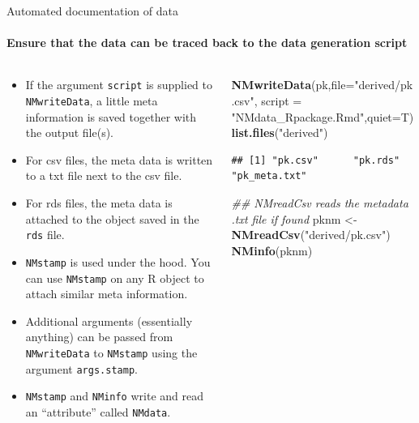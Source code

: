 \documentclass[
  8pt,
  ignorenonframetext,
  aspectratio=169]{beamer}
\newenvironment{Shaded}{\begin{snugshade}}{\end{snugshade}}
\newcommand{\CommentTok}[1]{\textcolor[rgb]{0.56,0.35,0.01}{\textit{#1}}}
\newcommand{\DataTypeTok}[1]{\textcolor[rgb]{0.13,0.29,0.53}{#1}}
\newcommand{\KeywordTok}[1]{\textcolor[rgb]{0.13,0.29,0.53}{\textbf{#1}}}
\newcommand{\NormalTok}[1]{#1}
\newcommand{\StringTok}[1]{\textcolor[rgb]{0.31,0.60,0.02}{#1}}
\begin{document}
\begin{frame}[fragile]{Automated documentation of data}
\protect\hypertarget{automated-documentation-of-data}{}
\framesubtitle{Ensure that the data can be traced back to the data generation script}

\begin{columns}[T]
\begin{column}{0.48\textwidth}
\begin{itemize}
\item
  If the argument \texttt{script} is supplied to \texttt{NMwriteData}, a
  little meta information is saved together with the output file(s).
\item
  For csv files, the meta data is written to a txt file next to the csv
  file.
\item
  For rds files, the meta data is attached to the object saved in the
  \texttt{rds} file.
\item
  \texttt{NMstamp} is used under the hood. You can use \texttt{NMstamp}
  on any R object to attach similar meta information.
\item
  Additional arguments (essentially anything) can be passed from
  \texttt{NMwriteData} to \texttt{NMstamp} using the argument
  \texttt{args.stamp}.
\item
  \texttt{NMstamp} and \texttt{NMinfo} write and read an ``attribute''
  called \texttt{NMdata}.
\end{itemize}
\end{column}

\begin{column}{0.48\textwidth}
\footnotesize

\begin{Shaded}
\begin{Highlighting}[]
\KeywordTok{NMwriteData}\NormalTok{(pk,}\DataTypeTok{file=}\StringTok{"derived/pk.csv"}\NormalTok{,}
            \DataTypeTok{script =} \StringTok{"NMdata\_Rpackage.Rmd"}\NormalTok{,}\DataTypeTok{quiet=}\NormalTok{T)}
\KeywordTok{list.files}\NormalTok{(}\StringTok{"derived"}\NormalTok{)}
\end{Highlighting}
\end{Shaded}

\begin{verbatim}
## [1] "pk.csv"      "pk.rds"      "pk_meta.txt"
\end{verbatim}

\begin{Shaded}
\begin{Highlighting}[]
\CommentTok{\#\# NMreadCsv reads the metadata .txt file if found}
\NormalTok{pknm \textless{}{-}}\StringTok{ }\KeywordTok{NMreadCsv}\NormalTok{(}\StringTok{"derived/pk.csv"}\NormalTok{)}
\KeywordTok{NMinfo}\NormalTok{(pknm)}
\end{Highlighting}
\end{Shaded}


\end{column}
\end{columns}
\end{frame}
\end{document}
